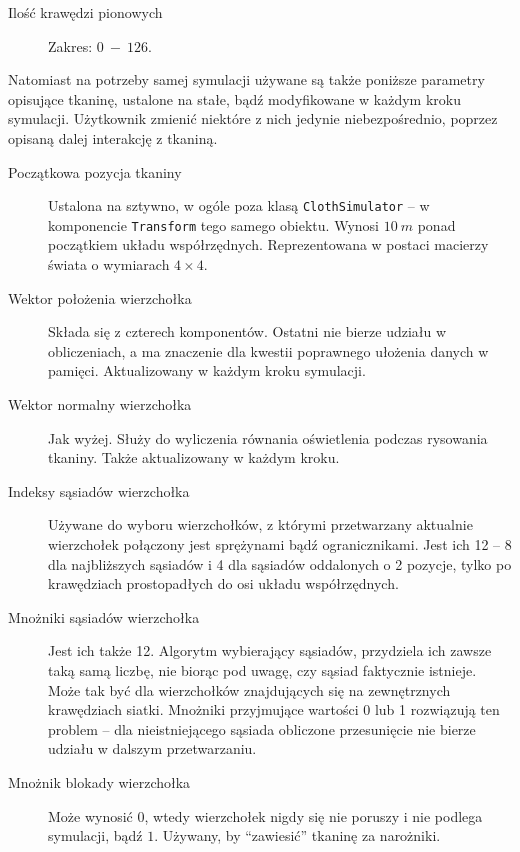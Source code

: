 \begin{description}
			\item[Ilość krawędzi pionowych] Zakres: \(0\ -\ 126\).
			
		\end{description}
		
		Natomiast na potrzeby samej symulacji używane są także poniższe parametry opisujące tkaninę, ustalone na stałe, bądź modyfikowane w każdym kroku symulacji. Użytkownik zmienić niektóre z nich jedynie niebezpośrednio, poprzez opisaną dalej interakcję z tkaniną.
		
		\begin{description}
			
			\item[Początkowa pozycja tkaniny] Ustalona na sztywno, w ogóle poza klasą \texttt{ClothSimulator} -- w komponencie \texttt{Transform} tego samego obiektu. Wynosi \(10\ m\) ponad początkiem układu współrzędnych. Reprezentowana w postaci macierzy świata o wymiarach \(4\times4 \).
			
			\item[Wektor położenia wierzchołka] Składa się z czterech komponentów. Ostatni nie bierze udziału w obliczeniach, a ma znaczenie dla kwestii poprawnego ułożenia danych w pamięci. Aktualizowany w każdym kroku symulacji.
			
			\item[Wektor normalny wierzchołka] Jak wyżej. Służy do wyliczenia równania oświetlenia podczas rysowania tkaniny. Także aktualizowany w każdym kroku.
			
			\item[Indeksy sąsiadów wierzchołka] Używane do wyboru wierzchołków, z którymi przetwarzany aktualnie wierzchołek połączony jest sprężynami bądź ogranicznikami. Jest ich 12 -- 8 dla najbliższych sąsiadów i 4 dla sąsiadów oddalonych o 2 pozycje, tylko po krawędziach prostopadłych do osi układu współrzędnych. 
			
			\item[Mnożniki sąsiadów wierzchołka] Jest ich także 12. Algorytm wybierający sąsiadów, przydziela ich zawsze taką samą liczbę, nie biorąc pod uwagę, czy sąsiad faktycznie istnieje. Może tak być dla wierzchołków znajdujących się na zewnętrznych krawędziach siatki. Mnożniki przyjmujące wartości 0 lub 1 rozwiązują ten problem -- dla nieistniejącego sąsiada obliczone przesunięcie nie bierze udziału w dalszym przetwarzaniu.
			
			\item[Mnożnik blokady wierzchołka] Może wynosić \(0\), wtedy wierzchołek nigdy się nie poruszy i nie podlega symulacji, bądź \(1\). Używany, by ``zawiesić'' tkaninę za narożniki.
			

\end{description}
